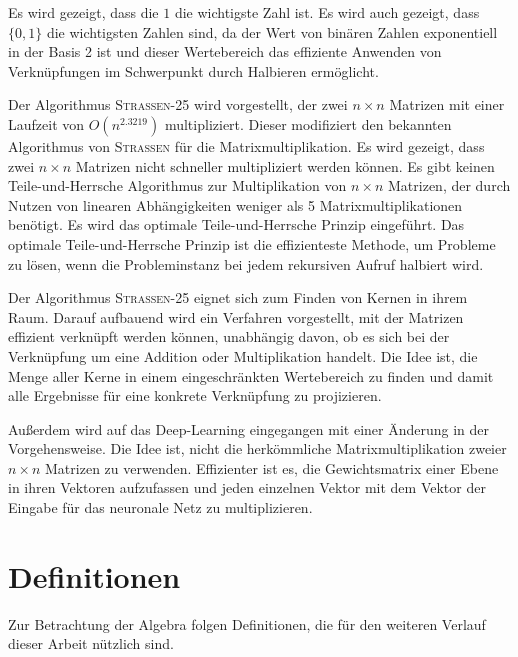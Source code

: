 \documentclass{report}
\numberwithin{equation}{section}
\begin{document}
Es wird gezeigt, dass die $1$ die wichtigste Zahl ist. Es wird auch gezeigt, dass $\{0, 1\}$ die wichtigsten Zahlen sind, da der Wert von binären Zahlen exponentiell in der Basis 2 ist und dieser Wertebereich das effiziente Anwenden von Verknüpfungen im Schwerpunkt durch Halbieren ermöglicht.

Der Algorithmus \textsc{Strassen-25} wird vorgestellt, der zwei $n \times n$ Matrizen mit einer Laufzeit von $O(n^{2.3219})$ multipliziert. Dieser modifiziert den bekannten Algorithmus von \textsc{Strassen} für die Matrixmultiplikation. Es wird gezeigt, dass zwei $n \times n$ Matrizen nicht schneller multipliziert werden können. Es gibt keinen Teile-und-Herrsche Algorithmus zur Multiplikation von $n \times n$ Matrizen, der durch Nutzen von linearen Abhängigkeiten weniger als 5 Matrixmultiplikationen benötigt. Es wird das optimale Teile-und-Herrsche Prinzip eingeführt. Das optimale Teile-und-Herrsche Prinzip ist die effizienteste Methode, um Probleme zu lösen, wenn die Probleminstanz bei jedem rekursiven Aufruf halbiert wird.

Der Algorithmus \textsc{Strassen-25} eignet sich zum Finden von Kernen in ihrem Raum. Darauf aufbauend wird ein Verfahren vorgestellt, mit der Matrizen effizient verknüpft werden können, unabhängig davon, ob es sich bei der Verknüpfung um eine Addition oder Multiplikation handelt. Die Idee ist, die Menge aller Kerne in einem eingeschränkten Wertebereich zu finden und damit alle Ergebnisse für eine konkrete Verknüpfung zu projizieren. 
 
Außerdem wird auf das Deep-Learning eingegangen mit einer Änderung in der Vorgehensweise. Die Idee ist, nicht die herkömmliche  Matrixmultiplikation zweier $n \times n$ Matrizen zu verwenden. Effizienter ist es, die Gewichtsmatrix einer Ebene in ihren Vektoren aufzufassen und jeden einzelnen Vektor mit dem Vektor der Eingabe für das neuronale Netz zu multiplizieren.

\chapter{Definitionen}
Zur Betrachtung der Algebra folgen Definitionen, die für den weiteren Verlauf dieser Arbeit nützlich sind.
\end{document}
